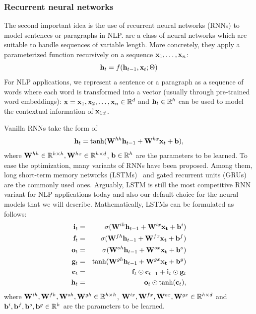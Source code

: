 \subsubsection*{Recurrent neural networks}
The second important idea is the use of recurrent neural networks (RNNs) to model sentences or paragraphs in NLP.  are a class of neural networks which are suitable to handle sequences of variable length. More concretely, they apply a parameterized function recursively on a sequence $\mathbf{x}_1, \ldots, \mathbf{x}_n$:
\begin{equation}
    \mathbf{h}_t = f(\mathbf{h}_{t-1}, \mathbf{x}_t; \Theta)
\end{equation}
For NLP applications, we represent a sentence or a paragraph as a sequence of words where each word is transformed into a vector (usually through pre-trained word embeddings): $\mathbf{x} = \mathbf{x}_1, \mathbf{x}_2, \ldots, \mathbf{x}_n \in \mathbb{R}^d$ and $\mathbf{h}_t \in \mathbb{R}^h$ can be used to model the contextual information of $\mathbf{x}_{1:t}$.

Vanilla RNNs take the form of
\begin{equation}
    \mathbf{h}_t = \tanh(\mathbf{W}^{hh}\mathbf{h}_{t-1} + \mathbf{W}^{hx}\mathbf{x}_t + \mathbf{b}),
\end{equation}
where $\mathbf{W}^{hh} \in \mathbb{R}^{h \times h}, \mathbf{W}^{hx} \in \mathbb{R}^{h\times d}$, $\mathbf{b} \in \mathbb{R}^h$ are the parameters to be learned. To ease the optimization, many variants of RNNs have been proposed. Among them, long short-term memory networks (LSTMs)~\cite{hochreiter1997} and gated recurrent units (GRUs)~\cite{cho2014learning} are the commonly used ones. Arguably, LSTM is still the most competitive RNN variant for NLP applications today and also our default choice for the neural models that we will describe. Mathematically, LSTMs can be formulated as follows:
\begin{eqnarray}
    \mathbf{i}_t & = & \sigma(\mathbf{W}^{ih}\mathbf{h}_{t-1} + \mathbf{W}^{ix}\mathbf{x_t} + \mathbf{b}^{i}) \\
    \mathbf{f}_t & = & \sigma(\mathbf{W}^{fh}\mathbf{h}_{t-1} + \mathbf{W}^{fx}\mathbf{x_t} + \mathbf{b}^{f}) \\
    \mathbf{o}_t & = & \sigma(\mathbf{W}^{oh}\mathbf{h}_{t-1} + \mathbf{W}^{ox}\mathbf{x_t} + \mathbf{b}^{o}) \\
    \mathbf{g}_t & = & \tanh(\mathbf{W}^{gh}\mathbf{h}_{t-1} + \mathbf{W}^{gx}\mathbf{x_t} + \mathbf{b}^{g}) \\
    \mathbf{c}_t & = & \mathbf{f}_t \odot \mathbf{c}_{t-1} + \mathbf{i}_t \odot \mathbf{g}_t \\
    \mathbf{h}_t & = & \mathbf{o}_t \odot \tanh(\mathbf{c}_t),
\end{eqnarray}
where $\mathbf{W}^{ih}, \mathbf{W}^{fh}, \mathbf{W}^{oh}, \mathbf{W}^{gh} \in \mathbb{R}^{h \times h}$, $\mathbf{W}^{ix}, \mathbf{W}^{fx}, \mathbf{W}^{ox}, \mathbf{W}^{gx} \in \mathbb{R}^{h \times d}$ and $\mathbf{b}^{i}, \mathbf{b}^{f}, \mathbf{b}^{o}, \mathbf{b}^{g} \in \mathbb{R}^h$ are the parameters to be learned.

